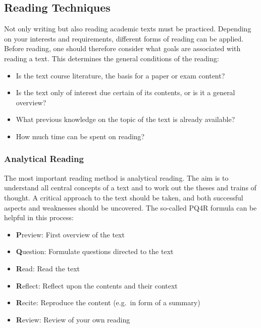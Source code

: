 \documentclass[
  english,
]{scrreprt}
\begin{document}
\subsection{Reading Techniques}\label{sec:reading_techniques}

Not only writing but also reading academic texts must be practiced. Depending on your interests and requirements, different forms of reading can be applied. Before reading, one should therefore consider what goals are associated with reading a text. This determines the general conditions of the reading:

\begin{itemize}
\item
  Is the text course literature, the basis for a paper or exam content?
\item
  Is the text only of interest due certain of its contents, or is it a general overview?
\item
  What previous knowledge on the topic of the text is already available?
\item
  How much time can be spent on reading?
\end{itemize}

\subsubsection{Analytical Reading}\label{sec:analytical_reading}

The most important reading method is analytical reading. The aim is to understand all central concepts of a text and to work out the theses and trains of thought. A critical approach to the text should be taken, and both successful aspects and weaknesses should be uncovered. The so-called PQ4R formula can be helpful in this process:

\begin{itemize}
\item
  \textbf{P}review: First overview of the text
\item
  \textbf{Q}uestion: Formulate questions directed to the text
\item
  \textbf{R}ead: Read the text
\item
  \textbf{R}eflect: Reflect upon the contents and their context
\item
  \textbf{R}ecite: Reproduce the content (e.g.~in form of a summary)
\item
  \textbf{R}eview: Review of your own reading
\end{itemize}
\end{document}
